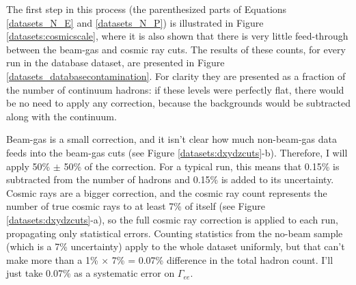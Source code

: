 The first step in this process (the parenthesized parts of Equations
\ref{datasets_N_E} and \ref{datasets_N_P}) is illustrated in Figure
\ref{datasets:cosmicscale}, where it is also shown that there is very
little feed-through between the beam-gas and cosmic ray cuts.  The
results of these counts, for every run in the database dataset, are
presented in Figure \ref{datasets_databasecontamination}.  For clarity
they are presented as a fraction of the number of continuum
hadrons: if these levels were perfectly flat, there would be no need
to apply any correction, because the backgrounds would be subtracted
along with the continuum.

Beam-gas is a small correction, and it isn't clear how much
non-beam-gas data feeds into the beam-gas cuts (see Figure
\ref{datasets:dxydzcuts}-b).  Therefore, I will apply 50\% $\pm$ 50\%
of the correction.  For a typical run, this means that 0.15\% is
subtracted from the number of hadrons and 0.15\% is added to its
uncertainty.  Cosmic rays are a bigger correction, and the cosmic ray
count represents the number of true cosmic rays to at least 7\% of
itself (see Figure \ref{datasets:dxydzcuts}-a), so the full cosmic ray
correction is applied to each run, propagating only statistical
errors.  Counting statistics from the no-beam sample (which is a 7\%
uncertainty) apply to the whole dataset uniformly, but that can't make
more than a 1\% $\times$ 7\% = 0.07\% difference in the total hadron
count.  I'll just take 0.07\% as a systematic error on $\Gamma_{ee}$.

